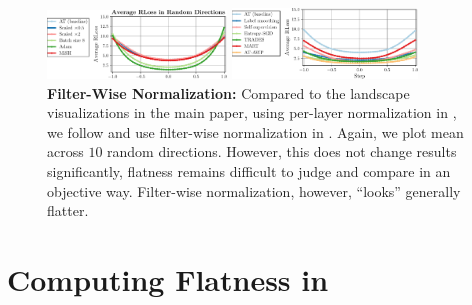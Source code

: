 \begin{figure}[t]
	\centering
	\vspace*{-0.2cm}
	
	\includegraphics[width=0.425\textwidth]{plots_supp_random_filter}
	\vspace*{2px}
	
	\hspace*{-0.35cm}
	\includegraphics[width=0.44\textwidth]{plots_supp_random_filter2}
	\vspace*{-4px}
	\caption{\textbf{Filter-Wise Normalization:} Compared to the \RCE landscape visualizations in the main paper, using per-layer normalization in , we follow \cite{LiNIPS2018} and use filter-wise normalization in . Again, we plot mean \RCE across $10$ random directions. However, this does not change results significantly, flatness remains difficult to judge and compare in an objective way. Filter-wise normalization, however, ``looks'' generally flatter.}
	\label{fig:supp-visualization-li}
	\vspace*{-6px}
\end{figure}

\section{Computing Flatness in \RCE}
\label{sec:supp-flatness-computation}

